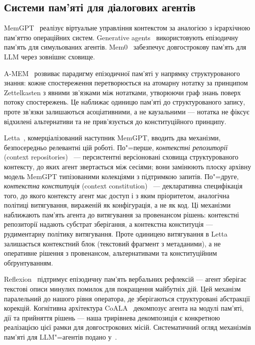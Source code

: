 \documentclass[11pt]{article}
\begin{document}
\subsection{Системи пам'яті для діалогових агентів}

MemGPT~\citep{packer2023memgpt} реалізує віртуальне управління контекстом за аналогією з ієрархічною пам'яттю операційних систем.
Generative agents~\citep{park2023generative} використовують епізодичну пам'ять для симульованих агентів.
Mem0~\citep{chhikara2025mem0} забезпечує довгострокову пам'ять для LLM через зовнішнє сховище.

A-MEM~\citep{xu2024amem} розвиває парадигму епізодичної пам'яті у напрямку структурованого
знання: кожне спостереження перетворюється на атомарну нотатку за принципом
Zettelkasten з явними зв'язками між нотатками, утворюючи граф знань поверх
потоку спостережень.
Це наближає одиницю пам'яті до структурованого запису, проте зв'язки
залишаються асоціативними, а не каузальними --- нотатка не фіксує
відхилені альтернативи та не прив'язується до конституційного принципу.

Letta~\citep{letta2025lettacode}, комерціалізований наступник MemGPT, вводить два механізми,
безпосередньо релевантні цій роботі.
По"=перше, \emph{контекстні репозиторії} (context repositories)~\citep{letta2026repositories} ---
персистентні версіоновані сховища структурованого контексту, до яких агент
звертається між сесіями; вони замінюють плоску архівну модель MemGPT
типізованими колекціями з підтримкою запитів.
По"=друге, \emph{контекстна конституція} (context constitution)~\citep{letta2026constitution} ---
декларативна специфікація того, до якого контексту агент має доступ і
з яким пріоритетом, аналогічна політиці витягування, вираженій як конфігурація,
а не як код.
Ці механізми наближають пам'ять агента до витягування за провенансом рішень:
контекстні репозиторії надають субстрат зберігання, а контекстна конституція ---
рудиментарну політику витягування.
Проте одиницею витягування в Letta залишається контекстний блок
(текстовий фрагмент з метаданими), а не оперативне рішення з провенансом,
альтернативами та конституційним обґрунтуванням.

Reflexion~\citep{shinn2023reflexion} підтримує епізодичну пам'ять вербальних рефлексій --- агент зберігає текстові описи минулих помилок для покращення майбутніх дій.
Цей механізм паралельний до нашого рівня оператора, де зберігаються структуровані абстракції корекцій.
Когнітивна архітектура CoALA~\citep{sumers2024coala} декомпозує агента на модулі пам'яті, дії та прийняття рішень --- наша трирівнева декомпозиція є конкретною реалізацією цієї рамки для довгострокових місій.
Систематичний огляд механізмів пам'яті для LLM"=агентів подано
у~\citet{zhang2024survey}.
\end{document}
